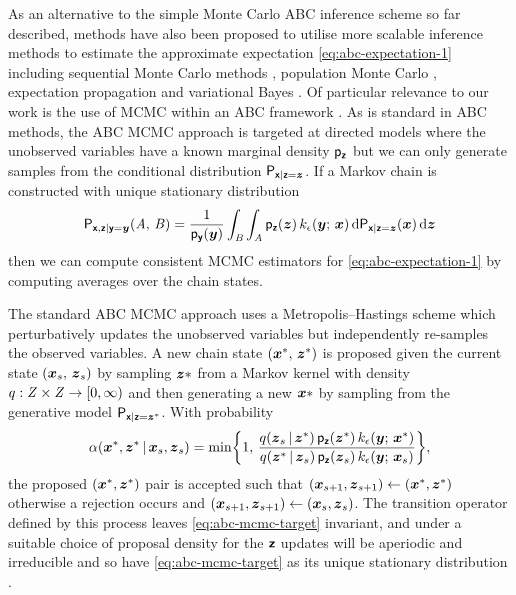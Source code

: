 As an alternative to the simple Monte Carlo \ac{ABC} inference scheme so far described, methods have also been proposed to utilise more scalable inference methods to estimate the approximate expectation \eqref{eq:abc-expectation-1} including sequential Monte Carlo methods \citep{sisson2007sequential,toni2009approximate}, population Monte Carlo \citep{beaumont2009adaptive}, expectation propagation \citep{barthelme2014expectation} and variational Bayes \citep{tran2017variational}. Of particular relevance to our work is the use of \ac{MCMC} within an \ac{ABC} framework \citep{marjoram2003markov,sisson2011likelihood}. As is standard in \ac{ABC} methods, the \ac{ABC} \ac{MCMC} approach is targeted at directed models where the unobserved variables have a known marginal density $\mathsf{p}_{\boldsymbol{\mathsf{z}}}$ but we can only generate samples from the conditional distribution $\mathsf{P}_{\boldsymbol{\mathsf{x}}|\boldsymbol{\mathsf{z}}=\boldsymbol{z}}$. If a Markov chain is constructed with unique stationary distribution
\begin{equation}\label{eq:abc-mcmc-target}
  \mathsf{P}_{\boldsymbol{\mathsf{x}},\boldsymbol{\mathsf{z}}|\boldsymbol{\mathsf{y}}=\boldsymbol{y}}(\mathit{A},\,\mathit{B}) =
  \frac{1}{\mathsf{p}_{\boldsymbol{\mathsf{y}}}(\boldsymbol{y})}
  \int_{\mathit{B}}\int_{\mathit{A}}
  \mathsf{p}_{\boldsymbol{\mathsf{z}}}(\boldsymbol{z})\,k_\epsilon(\boldsymbol{y};\,\boldsymbol{x})\,
  \mathrm{d}\mathsf{P}_{\boldsymbol{\mathsf{x}} | \boldsymbol{\mathsf{z}}=\boldsymbol{z}}(\boldsymbol{x})\,
  \mathrm{d}\boldsymbol{z}
\end{equation}
then we can compute consistent \ac{MCMC} estimators for \eqref{eq:abc-expectation-1} by computing averages over the chain states. 

The standard \ac{ABC} \ac{MCMC} approach uses a Metropolis--Hastings scheme which perturbatively updates the unobserved variables but independently re-samples the observed variables. A new chain state $(\boldsymbol{x}^*,\,\boldsymbol{z}^*)$ is proposed given the current state $(\boldsymbol{x}_s,\,\boldsymbol{z}_s)$ by sampling $\boldsymbol{z}*$ from a Markov kernel with density $q : \mathit{Z} \times \mathit{Z} \to [0, \infty)$ and then generating a new $\boldsymbol{x}*$ by sampling from the generative model $\mathsf{P}_{\boldsymbol{\mathsf{x}}|\boldsymbol{\mathsf{z}}=\boldsymbol{z}^*}$. With probability
\begin{equation}\label{eq:abc-mcmc-accept}
  \alpha(\vct{x}^*,\vct{z}^* \gvn \vct{x}_s,\vct{z}_s) =
  \min\lbr 1,\,
    \frac
    {q(\vct{z}_s\gvn\vct{z}^*)\,\pden{\rvct{z}}(\vct{z}^*)\,k_\epsilon(\vct{y};\,\vct{x}^*)}
    {q(\vct{z}^*\gvn\vct{z}_s)\,\pden{\rvct{z}}(\vct{z}_s)\,k_\epsilon(\vct{y};\,\vct{x}_s)}
  \rbr,
\end{equation}
the proposed $(\boldsymbol{x}^*,\boldsymbol{z}^*)$ pair is accepted such that $(\boldsymbol{x}_{s+1}, \boldsymbol{z}_{s+1}) \gets (\boldsymbol{x}^*,\boldsymbol{z}^*)$ otherwise a rejection occurs and $(\boldsymbol{x}_{s+1}, \boldsymbol{z}_{s+1}) \gets (\boldsymbol{x}_s,\boldsymbol{z}_s)$. The transition operator defined by this process leaves \eqref{eq:abc-mcmc-target} invariant, and under a suitable choice of proposal density for the $\boldsymbol{\mathsf{z}}$ updates will be aperiodic and irreducible and so have \eqref{eq:abc-mcmc-target} as its unique stationary distribution \citep{marjoram2003markov,sisson2011likelihood}. 


